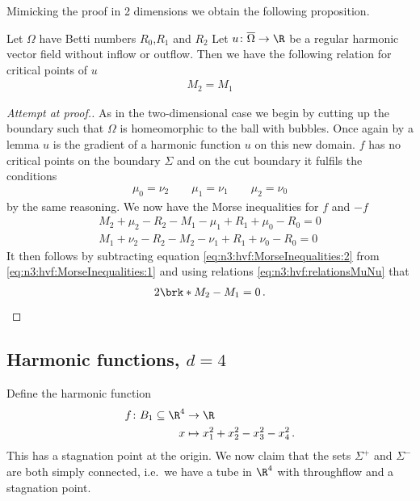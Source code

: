 Mimicking the proof in 2 dimensions we obtain the following proposition.
\begin{proposition}
  Let $\Omega$ have Betti numbers $R_0$,$R_1$ and $R_2$
  Let $u\colon\overline{\Omega}\to\R$ be a regular harmonic vector field without inflow or outflow. Then we have the following relation for
  critical points of $u$
  \begin{align*}
    M_2=M_1
  \end{align*}
\end{proposition}
\begin{proof}[Attempt at proof.]
  As in the two-dimensional case we begin by cutting up the boundary such that $\Omega$ is homeomorphic to the ball with bubbles.
  Once again by a lemma  $u$ is the gradient of a harmonic function $u$ on this new domain.
  $f$ has no critical points on the boundary $\Sigma$ and on the cut boundary it fulfils the conditions
  \begin{align}
    \mu_0=\nu_2\qquad \mu_1=\nu_1 \qquad \mu_2=\nu_0 \label{eq:n3:hvf:relationsMuNu}
  \end{align}
  by the same reasoning. We now have the Morse inequalities for $f$ and $-f$
  \begin{align}
    M_2+\mu_2-R_2-M_1-\mu_1+R_1+\mu_0-R_0=0 \label{eq:n3:hvf:MorseInequalities:1} \\
    M_1+\nu_2-R_2-M_2-\nu_1+R_1+\nu_0-R_0=0 \label{eq:n3:hvf:MorseInequalities:2}
  \end{align}
  It then follows by subtracting equation \eqref{eq:n3:hvf:MorseInequalities:2} from \eqref{eq:n3:hvf:MorseInequalities:1}
  and using relations \eqref{eq:n3:hvf:relationsMuNu} that
  \begin{align*}
    2\brk*{M_2-M_1}=0\,.
  \end{align*}
\end{proof}

\newpage

\subsection{Harmonic functions, $d=4$} 
Define the harmonic function 
\begin{align*}
  f\colon B_1\subseteq\R^4&\to \R \\
  x &\mapsto x_1^2+x_2^2-x_3^2-x_4^2\,.
\end{align*}
This has a stagnation point at the origin. We now claim that the sets $\Sigma^+$ and $\Sigma^-$ are both simply connected, i.e.\
we have a tube in $\R^4$ with throughflow and a stagnation point.

